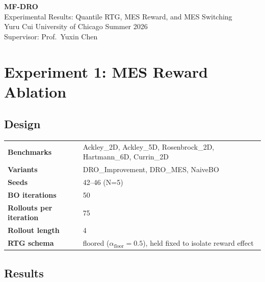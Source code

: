 \documentclass[11pt]{article}
\begin{document}
\begin{center}
    {\Large\bfseries MF-DRO}\\[6pt]
    {\large Experimental Results: Quantile RTG, MES Reward, and MES Switching}\\[4pt]
    {\small Yuru Cui \quad University of Chicago \quad Summer 2026}\\[2pt]
    {\small Supervisor: Prof.\ Yuxin Chen}
\end{center}

\section{Experiment 1: MES Reward Ablation}

\subsection{Design}

\begin{center}
\begin{tabular}{ll}
\toprule
\textbf{Benchmarks} & Ackley\_2D, Ackley\_5D, Rosenbrock\_2D, Hartmann\_6D, Currin\_2D \\
\textbf{Variants} & DRO\_Improvement, DRO\_MES, NaiveBO \\
\textbf{Seeds} & 42--46 (N=5) \\
\textbf{BO iterations} & 50 \\
\textbf{Rollouts per iteration} & 75 \\
\textbf{Rollout length} & 4 \\
\textbf{RTG schema} & floored ($\alpha_{\text{floor}}=0.5$), held fixed to isolate reward effect \\
\bottomrule
\end{tabular}
\end{center}

\subsection{Results}
\end{document}
